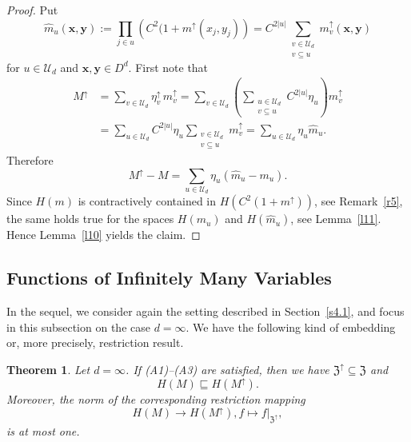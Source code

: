 \documentclass{article}
\newcommand{\bx}{{\mathbf x}}
\newcommand{\by}{{\mathbf y}}
\newcommand{\Z}{{\mathfrak Z}}
\newcommand{\U}  {\mathcal{U}}
\newcommand{\up}{\uparrow}
\theoremstyle{plain}
\newtheorem{theo}{Theorem}
\theoremstyle{definition}
\begin{document}
\begin{proof}
Put
\[
\widehat{m}_u(\bx,\by) := 
\prod_{j\in u} \left(C^2(1+m^{\up}(x_j,y_j)\right)
= C^{2|u|} \sum_{\substack{v \in \U_d \\ v \subseteq u}}
m^{\up}_{v}(\bx,\by)
\]
for $u \in \U_d$ and $\bx,\by \in D^d$.
First note that
\begin{equation*}
\begin{split}
M^{\up}
&=\sum_{v\in \U_d} \eta_v^{\up} \, m^{\up}_{v}
=\sum_{v\in \U_d} \left( \sum_{\substack{u \in \U_d\\  v \subseteq u }}
C^{2 |u|}\eta_u \right) m^{\up}_{v} \\
&=\sum_{u\in \U_d}C^{2\left|u\right|}\eta_u
\sum_{\substack{v \in \U_d \\ v\subseteq u}}m^{\up}_{v}
= \sum_{u\in \U_d}\eta_u \widehat{m}_u.
\end{split}
\end{equation*}
Therefore
\[
M^{\up} - M =
\sum_{u\in \U_d}\eta_u \left(\widehat{m}_u - m_u \right).
\]
Since $H(m)$ is contractively contained in $H(C^2(1+m^{\up}))$, 
see Remark~\ref{r5}, 
the same holds true for the spaces $H(m_{u})$ and $H(\widehat{m}_u)$,
see Lemma~\ref{l11}. Hence Lemma~\ref{l10} yields the claim.
\end{proof}


\subsection{Functions
of Infinitely Many Variables}
\label{Subsec:Infinite_Variables_FSE}

In the sequel, we consider again the setting described in 
Section~\ref{s4.1}, and focus in this subsection on the case 
$d = \infty$. We have the following kind of embedding 
or, more precisely, restriction result.


\begin{theo}\label{Lemma4}
Let $d = \infty$. If {\rm (A1)--(A3)} are satisfied, then we have
$\Z^{\up} \subseteq \Z$ and
$$
H(M) \sqsubseteq H (M^{\up}).
$$ 
Moreover,
the norm of the corresponding restriction mapping 
\[
H(M) \to H (M^{\up}),
f \mapsto f|_{\Z^{\up}},
\]
is at most one.
\end{theo}
\end{document}
